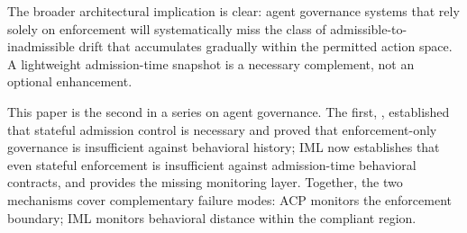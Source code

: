 \documentclass[11pt]{article}
\begin{document}
The broader architectural implication is clear: agent governance systems that
rely solely on enforcement will systematically miss the class of
admissible-to-inadmissible drift that accumulates gradually within the
permitted action space.  A lightweight admission-time snapshot is a necessary
complement, not an optional enhancement.

This paper is the second in a series on agent governance.  The first,
\citet{fernandez2026acp}, established that stateful admission control is
necessary and proved that enforcement-only governance is insufficient against
behavioral history; IML now establishes that even stateful enforcement is
insufficient against admission-time behavioral contracts, and provides the
missing monitoring layer.  Together, the two mechanisms cover complementary
failure modes: ACP monitors the enforcement boundary; IML monitors behavioral
distance within the compliant region.



\end{document}
